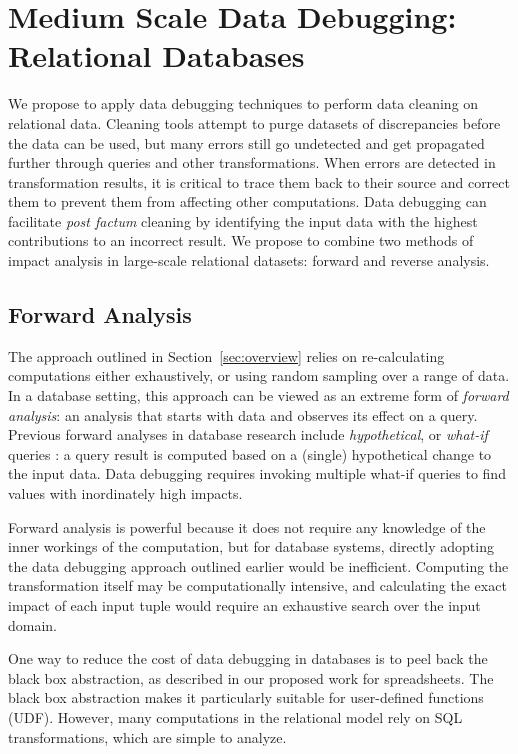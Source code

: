 \section{Medium Scale Data Debugging: Relational Databases} %
\label{sec:bi_directional}

We propose to apply data debugging techniques to perform data cleaning
on relational data.  Cleaning tools attempt to purge datasets of
discrepancies before the data can be used, but many errors still go
undetected and get propagated further through queries and other
transformations. When errors are detected in transformation results,
it is critical to trace them back to their source and correct them to
prevent them from affecting other computations. Data debugging can
facilitate \emph{post factum} cleaning by identifying the input data
with the highest contributions to an incorrect result. We propose to
combine two methods of impact analysis in large-scale relational
datasets: forward and reverse analysis.

\subsection{Forward Analysis} %
\label{sub:forward_analysis}

The approach outlined in Section~\ref{sec:overview} relies on
re-calculating computations either exhaustively, or using random
sampling over a range of data. In a database setting, this approach
can be viewed as an extreme form of \emph{forward analysis}: an
analysis that starts with data and observes its effect on a
query. Previous forward analyses in database research include
\emph{hypothetical}, or \emph{what-if} queries
\cite{DBLP:conf/vldb/BalminPP00,DBLP:conf/icde/LakshmananRS08}: a
query result is computed based on a (single) hypothetical change to
the input data. Data debugging requires invoking multiple what-if
queries to find values with inordinately high impacts.

Forward analysis is powerful because it does not require any knowledge
of the inner workings of the computation, but for database systems,
directly adopting the data debugging approach outlined earlier would
be inefficient. Computing the transformation itself may be
computationally intensive, and calculating the exact impact of each
input tuple would require an exhaustive search over the input domain.

One way to reduce the cost of data debugging in databases is to peel
back the black box abstraction, as described in our proposed work for
spreadsheets.  The black box abstraction makes it particularly
suitable for user-defined functions (UDF). However, many computations
in the relational model rely on SQL transformations, which are simple
to analyze.

